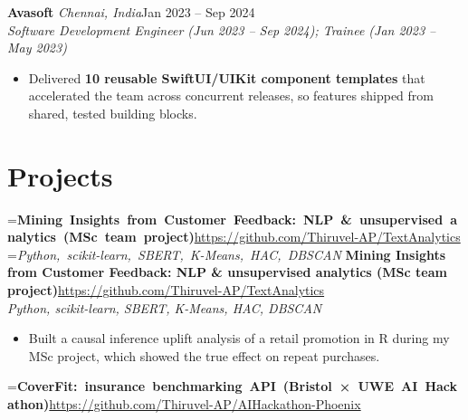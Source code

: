 \documentclass[a4paper,11pt]{article}
\newcommand{\role}[4]{%
  \textbf{#1}{\color{muted}\,\textperiodcentered\,\textit{#2}}\hfill{\color{muted}#3}\\
  \textit{#4}\par}
\newcommand{\project}[3]{%
  \textbf{#1}\hfill#3\\ {\color{muted}\small\textit{#2}}\par}
\newcommand{\gap}{\vspace{5pt}}
\newcommand{\num}[1]{\textbf{#1}}   %
\begin{document}
\gap
{}
\role{Avasoft}{Chennai, India}{Jan 2023 – Sep 2024}{Software Development Engineer (Jun 2023 – Sep 2024); Trainee (Jan 2023 – May 2023)}
\begin{itemize}
  \item Delivered \num{10 reusable SwiftUI/UIKit component templates} that accelerated the team across concurrent releases, so features shipped from shared, tested building blocks.
\end{itemize}

\section{Projects}
=\hbox{\textbf{Mining Insights from Customer Feedback: NLP \& unsupervised analytics (MSc team project)}\hspace{1em}\url{https://github.com/Thiruvel-AP/TextAnalytics}}%
=\hbox{{\small\textit{Python, scikit-learn, SBERT, K-Means, HAC, DBSCAN}}}%
\ifdim\wd0>\linewidth
\ifdim\wd2>\linewidth
\textbf{Mining Insights from Customer Feedback: NLP \& unsupervised analytics (MSc team project)}\\ {\color{muted}\small\textit{Python, scikit-learn, SBERT, K-Means, HAC, DBSCAN}}\\ \hfill{\small\url{https://github.com/Thiruvel-AP/TextAnalytics}}\par
\else
\textbf{Mining Insights from Customer Feedback: NLP \& unsupervised analytics (MSc team project)}\\ {\color{muted}\small\textit{Python, scikit-learn, SBERT, K-Means, HAC, DBSCAN}}\hfill{\small\url{https://github.com/Thiruvel-AP/TextAnalytics}}\par
\fi
\else
\project{Mining Insights from Customer Feedback: NLP \& unsupervised analytics (MSc team project)}{Python, scikit-learn, SBERT, K-Means, HAC, DBSCAN}{\url{https://github.com/Thiruvel-AP/TextAnalytics}}
\fi
\begin{itemize}
  \item Built a causal inference uplift analysis of a retail promotion in R during my MSc project, which showed the true effect on repeat purchases.
\end{itemize}
\gap
{}
=\hbox{\textbf{CoverFit: insurance benchmarking API (Bristol × UWE AI Hackathon)}\hspace{1em}\url{https://github.com/Thiruvel-AP/AIHackathon-Phoenix}}%
\end{document}
